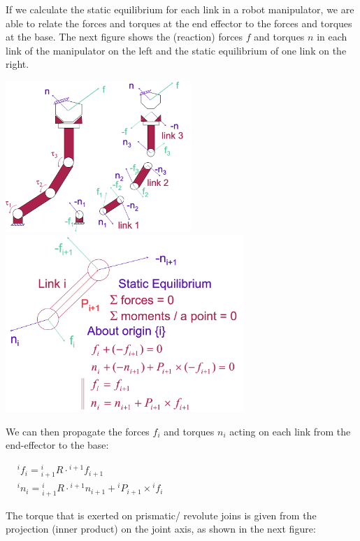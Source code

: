 If we calculate the static equilibrium for each link in a robot manipulator, we are able to relate the forces and torques at the end effector to the forces and torques at the base. The next figure shows the (reaction) forces $f$ and torques $n$ in each link of the manipulator on the left and the static equilibrium of one link on the right.
\begin{center}
	\includegraphics[width=7cm]{sections/imgs/4_propagate_forces_2.png}
	\hfill
	\includegraphics[width=9cm]{sections/imgs/4_propagate_forces.png}
\end{center}

We can then propagate the forces $f_i$ and torques $n_i$ acting on each link from the end-effector to the base:

\begin{center}
	$\begin{aligned}
	&{ }^{i} f_{i}={ }_{i+1}^{i} R \cdot{ }^{i+1} f_{i+1} \\
	&{ }^{i} n_{i}={ }_{i+1}^{i} R \cdot{ }^{i+1} n_{i+1}+{ }^{i} P_{i+1} \times{ }^{i} f_{i}
	\end{aligned}$
\end{center}

The torque that is exerted on prismatic/ revolute joins is given from the projection (inner product) on the joint axis, as shown in the next figure:

